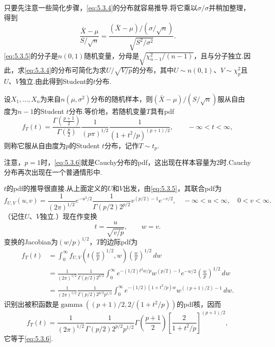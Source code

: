 只要先注意一些简化步骤，\eqref{eq:5.3.4}的分布就容易推导.将它乘以$\sigma/\sigma$并稍加整理，得到
\begin{equation}\label{eq:5.3.5}
\frac{\bar X-\mu}{S/\sqrt n}=\frac{(\bar X-\mu)/(\sigma/\sqrt n)}{\sqrt{S^2/\sigma^2}}.
\end{equation}
\eqref{eq:5.3.5}的分子是$n(0,1)$随机变量，分母是$\sqrt{\chi_{n-1}^2/(n-1)}$，且与分子独立.因此，求\eqref{eq:5.3.4}的分布可简化为求$U/\sqrt{V/p}$的分布，其中$U\sim n(0,1)$、$V\sim\chi_p^2$且$U$、$V$独立.由此得到Student的$t$分布.
\begin{definition}\label{def:5.3.4}
设$X_1,\ldots,X_n$为来自$n(\mu,\sigma^2)$分布的随机样本，则$(\bar X-\mu)/(S/\sqrt n)$服从自由度为$n-1$的Student $t$分布.等价地，若随机变量$T$具有pdf
\begin{equation}\label{eq:5.3.6}
f_T(t)=\frac{\Gamma\left(\frac{p+1}2\right)}{\Gamma\left(\frac p2\right)}\frac1{(p\pi)^{1/2}}\frac1{(1+t^2/p)^{(p+1)/2}},\qquad -\infty<t<\infty,
\end{equation}
则称它服从自由度为$p$的Student $t$分布，记作$T\sim t_p$.
\end{definition}
注意，$p=1$时，\eqref{eq:5.3.6}就是Cauchy分布的pdf，这出现在样本容量为2时.Cauchy分布再次出现在一个普通情形中.

$t$的pdf的推导很直接.从上面定义的$U$和$V$出发，由\eqref{eq:5.3.5}，其联合pdf为
$$f_{U,V}(u,v)=\frac1{(2\pi)^{1/2}}e^{-u^2/2}\frac1{\Gamma(p/2)2^{p/2}}v^{(p/2)-1}e^{-v/2},\quad -\infty<u<\infty,\quad 0<v<\infty.$$
（记住$U$、$V$独立.）现在作变换
$$t=\frac u{\sqrt{v/p}},\qquad w=v.$$
变换的Jacobian为$(w/p)^{1/2}$，$T$的边际pdf为
\begin{align*}
f_T(t)&=\int_0^\infty f_{U,V}\left(t\left(\frac wp\right)^{1/2},w\right)\left(\frac wp\right)^{1/2}\,dw\\
&=\frac1{(2\pi)^{1/2}}\frac1{\Gamma(p/2)2^{p/2}}\int_0^\infty e^{-(1/2)t^2w/p}w^{(p/2)-1}e^{-w/2}\left(\frac wp\right)^{1/2}\,dw\\
&=\frac1{(2\pi)^{1/2}}\frac1{\Gamma(p/2)2^{p/2}p^{1/2}}\int_0^\infty e^{-(1/2)(1+t^2/p)w}w^{((p+1)/2)-1}\,dw.
\end{align*}
识别出被积函数是$\operatorname{gamma}((p+1)/2,2/(1+t^2/p))$的pdf核，因而
$$f_T(t)=\frac1{(2\pi)^{1/2}}\frac1{\Gamma(p/2)2^{p/2}p^{1/2}}\Gamma\left(\frac{p+1}2\right)\left[\frac2{1+t^2/p}\right]^{(p+1)/2},$$
它等于\eqref{eq:5.3.6}.

